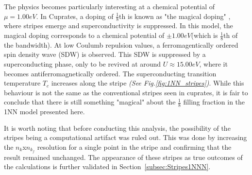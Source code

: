 \documentclass[12pt]{article}
\begin{document}
\noindent The physics becomes particularly interesting at a chemical potential of $\mu =1.00eV$. 
In  Cuprates, a doping of $\frac{1}{8}$th is known as "the magical doping" \cite{komiya2005magic}, where
stripes emerge and superconductivity is suppressed. In this model, the magical doping corresponds 
to a chemical potential of $\pm 1.00eV$(which is $\frac{1}{8}$th of the bandwidth). 
At low Coulumb repulsion values, a ferromagentically ordered spin density wave (SDW) is observed. This SDW is suppressed by a superconducting phase,
only to be revived at around $U \approx 15.00eV$, where it becomes antiferromagnetically ordered. The superconducting transition temperature $T_c$ increases along the stripe \textit{(See Fig.\ref{fig:1NN_stripes})}.
While this behaviour is not the same as the conventional stripes seen in cuprates, it is fair to conclude that there is still something 
"magical" about the $\frac{1}{8}$ filling fraction in the 1NN model presented here. \par
\medskip

\noindent It is  worth noting that before conducting this analysis, the possibility of the stripes being a computational artifact was ruled out.
This was done by increasing the $n_k$x$n_{k_f}$ resolution for a single point in the stripe and
confirming that the result remained unchanged. The appearance of these stripes as true outcomes of the calculations is further validated in Section~\ref{subsec:Stripes1NNN}.
\end{document}

